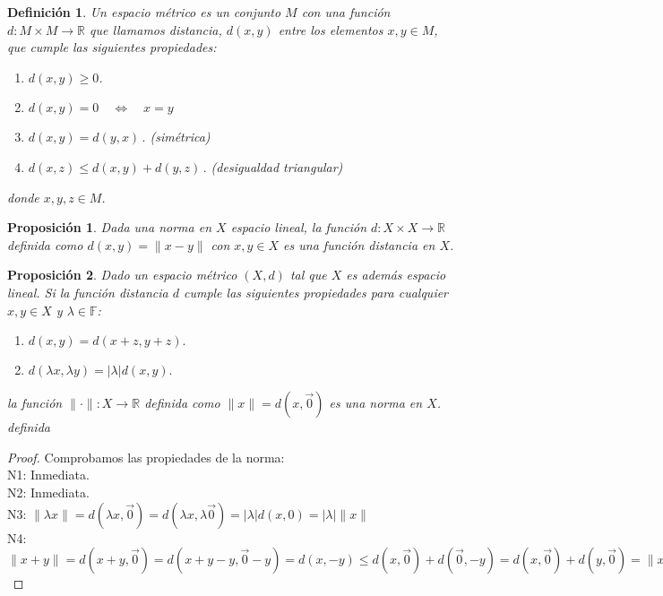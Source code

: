 \documentclass[12pt]{book}
\newtheorem{defn}{\bf Definición}[chapter]
\newtheorem{prop}{\bf Proposición}[chapter]
\begin{document}
\begin{defn} Un espacio m\'etrico es un conjunto $M$ con una funci\'on $d:M\times 
M\longrightarrow \mathbb{R}$ que llamamos distancia, $d(x,y)$ entre los elementos $x,y\in M$,  
que cumple las siguientes propiedades:
\begin{enumerate}
\renewcommand{\labelenumi}{\textrm{\bf M}$\arabic{enumi}$.}
\item $d(x,y)\geq 0$.
\item $d(x,y)=0\quad\Leftrightarrow\quad x=y$
\item $d(x,y)=d(y,x)\,.$  (sim\'etrica)
\item $d(x,z)\leq  d(x,y)+d(y,z)\,.$ (desigualdad triangular)
\end{enumerate}
donde $x,y,z\in M$.
\end{defn}

 
\begin{prop} Dada una norma en $X$ espacio lineal, la funci\'on $d:X\times 
X\longrightarrow\mathbb{R}$  definida como $d(x,y)=\lVert x-y\rVert$  con $x,y\in X$ es una 
funci\'on distancia en $X$.
\end{prop}

\begin{prop}  Dado un espacio m\'etrico $(X,d)$  tal que $X$ es adem\'as espacio lineal. Si la 
funci\'on distancia $d$ cumple las siguientes propiedades para cualquier $x,y\in X$ y $\lambda\in 
\mathbb{F}$:
\begin{enumerate}
\item $d(x,y)=d(x+z,y+z).$
\item $d(\lambda x,\lambda y)=\lvert \lambda\rvert d(x,y).$
\end{enumerate}
la  funci\'on $\lVert \cdot\rVert:X\longrightarrow\mathbb{R}$ definida como $\lVert x\rVert=d(x,\vec 
0)$ es una norma en $X$.  definida 
\end{prop}

\begin{proof}
Comprobamos las propiedades de la norma:\\
N1: Inmediata.\\
N2: Inmediata.\\
N3: $\lVert \lambda x\rVert=d(\lambda x,\vec 0)=d(\lambda x,\lambda \vec 0)=\lvert \lambda\rvert 
d(x,0)=\lvert \lambda\rvert\lVert x\rVert$ \\
N4:  $\lVert x+y\rVert=d(x+y,\vec 0)=d(x+y-y,\vec 0-y)=d(x,-y) \leq d(x,\vec 0) + d(\vec 0, -y)=d(x,\vec 
0) + d(y,\vec 0)=\lVert x\rVert+\lVert y\rVert$
\end{proof}
\end{document}
